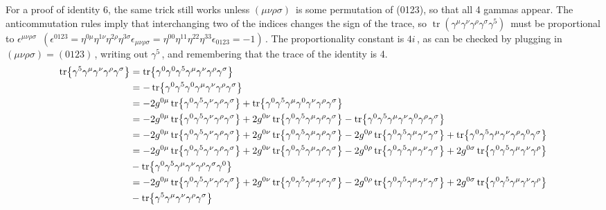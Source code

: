 \documentclass{article}
\newcommand{\gm}{\gamma^{\mu}}
\newcommand{\gn}{\gamma^{\nu}}
\newcommand{\gs}{\gamma^{\sigma}}
\newcommand{\gr}{\gamma^{\rho}}
\newcommand{\g}{\gamma}
\newcommand{\s}{\sigma}
\begin{document}
\begin{enumerate}[(i)]
  For a proof of identity 6, the same trick still works unless $ {\displaystyle (\mu \nu \rho \sigma )\,}$ is some permutation of (0123), so that all 4 gammas appear. The anticommutation rules imply that interchanging two of the indices changes the sign of the trace, so $ {\displaystyle \operatorname {tr} (\gamma ^{\mu }\gamma ^{\nu }\gamma ^{\rho }\gamma ^{\sigma }\gamma ^{5})\,}$ must be proportional to ${\displaystyle \epsilon ^{\mu \nu \rho \sigma }\,}$
  $ {\displaystyle (\epsilon ^{0123}=\eta ^{0\mu }\eta ^{1\nu }\eta ^{2\rho }\eta ^{3\sigma }\epsilon _{\mu \nu \rho \sigma }=\eta ^{00}\eta ^{11}\eta ^{22}\eta ^{33}\epsilon _{0123}=-1)\,}$. The proportionality constant is ${\displaystyle 4i\,}$, as can be checked by plugging in $ {\displaystyle (\mu \nu \rho \sigma )=(0123)\,} $, writing out $ {\displaystyle \gamma ^{5}\,}$, and remembering that the trace of the identity is 4.
  \begin{align*}
    \tr{\g^5\gm\gn\gr\gs}&=\tr{\g^0\g^0\g^5\gm\gn\gr\gs}\\
    &=-\tr{\g^0\g^5\g^0\gm\gn\gr\gs}\\
    &=-2g^{0\mu}\tr{\g^0\g^5\gn\gr\gs}+\tr{\g^0\g^5\gm\g^0\gn\gr\gs}\\
    &=-2g^{0\mu}\tr{\g^0\g^5\gn\gr\gs}+2g^{0\nu}\tr{\g^0\g^5\gm\gr\gs}-\tr{\g^0\g^5\gm\gn\g^0\gr\gs}\\
    &=-2g^{0\mu}\tr{\g^0\g^5\gn\gr\gs}+2g^{0\nu}\tr{\g^0\g^5\gm\gr\gs}-2g^{0\rho}\tr{\g^0\g^5\gm\gn\gs}+\tr{\g^0\g^5\gm\gn\gr\g^0\gs}\\
    &=-2g^{0\mu}\tr{\g^0\g^5\gn\gr\gs}+2g^{0\nu}\tr{\g^0\g^5\gm\gr\gs}-2g^{0\rho}\tr{\g^0\g^5\gm\gn\gs}+2g^{0\s}\tr{\g^0\g^5\gm\gn\gr}\\&-\tr{\g^0\g^5\gm\gn\gr\gs\g^0}\\
    &=-2g^{0\mu}\tr{\g^0\g^5\gn\gr\gs}+2g^{0\nu}\tr{\g^0\g^5\gm\gr\gs}-2g^{0\rho}\tr{\g^0\g^5\gm\gn\gs}+2g^{0\s}\tr{\g^0\g^5\gm\gn\gr}\\&-\tr{\g^5\gm\gn\gr\gs}\\

\end{align*}
\end{enumerate}
\end{document}
